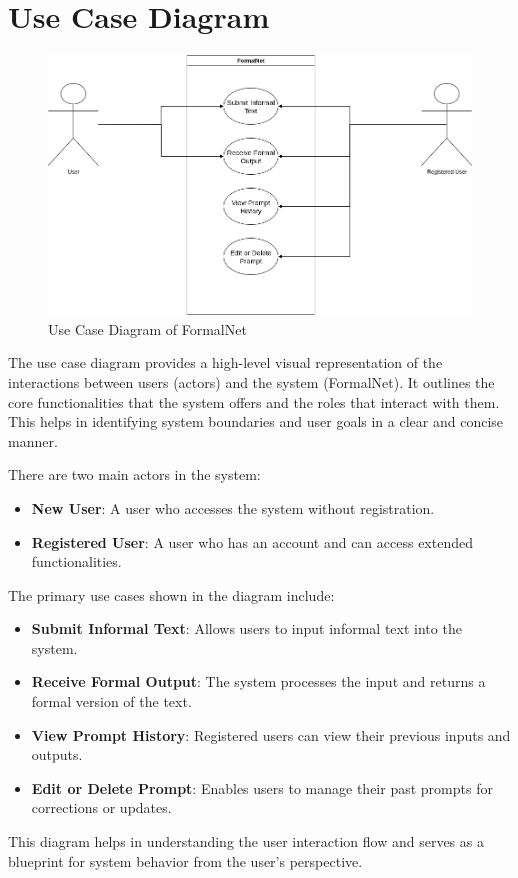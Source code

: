 \section{Use Case Diagram}
\begin{figure}[H]
  \centering
  \includegraphics[width=1\textwidth]{images/usecasediagram.png}
  \caption{Use Case Diagram of FormalNet}
  \label{fig:usecase}
\end{figure}
The use case diagram provides a high-level visual representation of the interactions between users (actors) and the system (FormalNet). It outlines the core functionalities that the system offers and the roles that interact with them. This helps in identifying system boundaries and user goals in a clear and concise manner.

There are two main actors in the system:
\begin{itemize}
    \item \textbf{New User}: A user who accesses the system without registration.
    \item \textbf{Registered User}: A user who has an account and can access extended functionalities.
\end{itemize}
The primary use cases shown in the diagram include:
\begin{itemize}
    \item \textbf{Submit Informal Text}: Allows users to input informal text into the system.
    \item \textbf{Receive Formal Output}: The system processes the input and returns a formal version of the text.
    \item \textbf{View Prompt History}: Registered users can view their previous inputs and outputs.
    \item \textbf{Edit or Delete Prompt}: Enables users to manage their past prompts for corrections or updates.
\end{itemize}
This diagram helps in understanding the user interaction flow and serves as a blueprint for system behavior from the user's perspective.